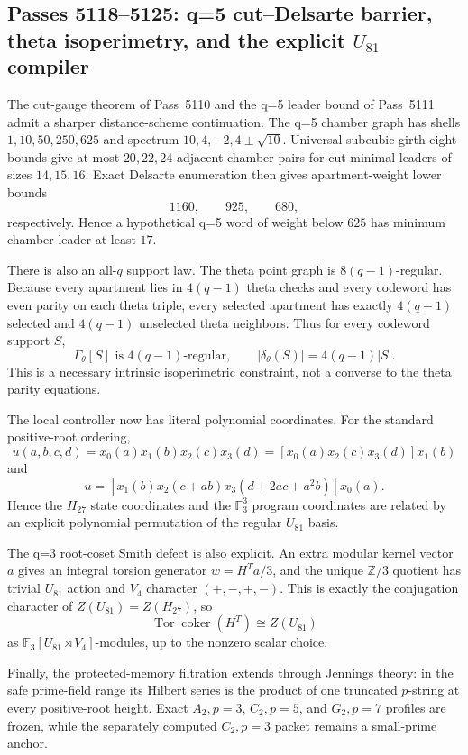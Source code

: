 \ifdefined\WPassFiveOneOneEightLoaded\else
\gdef\WPassFiveOneOneEightLoaded{1}
\subsection*{Passes 5118--5125: q=5 cut--Delsarte barrier, theta isoperimetry, and the explicit $U_{81}$ compiler}
The cut-gauge theorem of Pass~5110 and the q=5 leader bound of Pass~5111 admit a sharper distance-scheme continuation.  The q=5 chamber graph has shells $1,10,50,250,625$ and spectrum $10,4,-2,4\pm\sqrt{10}$.  Universal subcubic girth-eight bounds give at most $20,22,24$ adjacent chamber pairs for cut-minimal leaders of sizes $14,15,16$.  Exact Delsarte enumeration then gives apartment-weight lower bounds
\[
 1160,\qquad 925,\qquad 680,
\]
respectively.  Hence a hypothetical q=5 word of weight below $625$ has minimum chamber leader at least $17$.

There is also an all-$q$ support law.  The theta point graph is $8(q-1)$-regular.  Because every apartment lies in $4(q-1)$ theta checks and every codeword has even parity on each theta triple, every selected apartment has exactly $4(q-1)$ selected and $4(q-1)$ unselected theta neighbors.  Thus for every codeword support $S$,
\[
 \Gamma_\theta[S]\text{ is }4(q-1)\text{-regular},\qquad
 |\delta_\theta(S)|=4(q-1)|S|.
\]
This is a necessary intrinsic isoperimetric constraint, not a converse to the theta parity equations.

The local controller now has literal polynomial coordinates.  For the standard positive-root ordering,
\[
 u(a,b,c,d)=x_0(a)x_1(b)x_2(c)x_3(d)
 =[x_0(a)x_2(c)x_3(d)]x_1(b)
\]
and
\[
 u=[x_1(b)x_2(c+ab)x_3(d+2ac+a^2b)]x_0(a).
\]
Hence the $H_{27}$ state coordinates and the $\mathbb F_3^3$ program coordinates are related by an explicit polynomial permutation of the regular $U_{81}$ basis.

The q=3 root-coset Smith defect is also explicit.  An extra modular kernel vector $a$ gives an integral torsion generator $w=H^Ta/3$, and the unique $\mathbb Z/3$ quotient has trivial $U_{81}$ action and $V_4$ character $(+,-,+,-)$.  This is exactly the conjugation character of $Z(U_{81})=Z(H_{27})$, so
\[
 \operatorname{Tor}\operatorname{coker}(H^T)\cong Z(U_{81})
\]
as $\mathbb F_3[U_{81}\rtimes V_4]$-modules, up to the nonzero scalar choice.

Finally, the protected-memory filtration extends through Jennings theory: in the safe prime-field range its Hilbert series is the product of one truncated $p$-string at every positive-root height.  Exact $A_2,p=3$, $C_2,p=5$, and $G_2,p=7$ profiles are frozen, while the separately computed $C_2,p=3$ packet remains a small-prime anchor.

